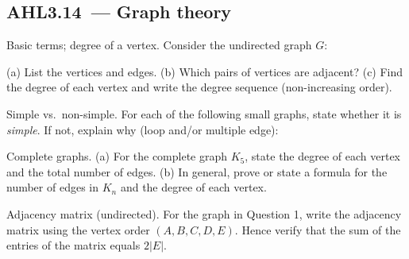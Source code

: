 \documentclass[11pt]{article}
\def\textbf#1{#1}%
\newcommand{\tocsubsection}[1]{\subsection{#1}}
\newcounter{question}
\begin{document}
\tocsubsection{AHL3.14 — Graph theory}


\begin{question}
\textbf{Basic terms; degree of a vertex.}
Consider the undirected graph $G$:
\begin{center}
\end{center}
(a) List the vertices and edges. (b) Which pairs of vertices are adjacent?  
(c) Find the degree of each vertex and write the degree sequence (non-increasing order).
\end{question}

\begin{question}
\textbf{Simple vs.\ non-simple.}
For each of the following small graphs, state whether it is \emph{simple}. If not, explain why (loop and/or multiple edge):
\begin{center}
\qquad
{}
\end{center}
\end{question}

\begin{question}
\textbf{Complete graphs.}
(a) For the complete graph $K_5$, state the degree of each vertex and the total number of edges.  
(b) In general, prove or state a formula for the number of edges in $K_n$ and the degree of each vertex.
\end{question}

\begin{question}
\textbf{Adjacency matrix (undirected).}
For the graph in Question 1, write the adjacency matrix using the vertex order $(A,B,C,D,E)$.  
Hence verify that the sum of the entries of the matrix equals $2|E|$.
\end{question}
\end{document}
